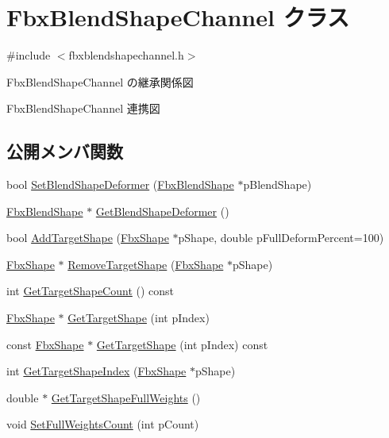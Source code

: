 \hypertarget{class_fbx_blend_shape_channel}{}\section{Fbx\+Blend\+Shape\+Channel クラス}
\label{class_fbx_blend_shape_channel}


{\ttfamily \#include $<$fbxblendshapechannel.\+h$>$}



Fbx\+Blend\+Shape\+Channel の継承関係図


Fbx\+Blend\+Shape\+Channel 連携図
\subsection*{公開メンバ関数}
\begin{DoxyCompactItemize}
\item 
bool \hyperlink{class_fbx_blend_shape_channel_afa4cd576c24385c4ee10279a1deabc4d}{Set\+Blend\+Shape\+Deformer} (\hyperlink{class_fbx_blend_shape}{Fbx\+Blend\+Shape} $\ast$p\+Blend\+Shape)
\item 
\hyperlink{class_fbx_blend_shape}{Fbx\+Blend\+Shape} $\ast$ \hyperlink{class_fbx_blend_shape_channel_aa79b43cdb62a8dc5bbafad03acbf4425}{Get\+Blend\+Shape\+Deformer} ()
\item 
bool \hyperlink{class_fbx_blend_shape_channel_aa09d012a7304dd2098ebd2a066d53dde}{Add\+Target\+Shape} (\hyperlink{class_fbx_shape}{Fbx\+Shape} $\ast$p\+Shape, double p\+Full\+Deform\+Percent=100)
\item 
\hyperlink{class_fbx_shape}{Fbx\+Shape} $\ast$ \hyperlink{class_fbx_blend_shape_channel_a13265acf6f671cf6ec1228105831ff15}{Remove\+Target\+Shape} (\hyperlink{class_fbx_shape}{Fbx\+Shape} $\ast$p\+Shape)
\item 
int \hyperlink{class_fbx_blend_shape_channel_a61e052b389537fcb7db318853c17160c}{Get\+Target\+Shape\+Count} () const
\item 
\hyperlink{class_fbx_shape}{Fbx\+Shape} $\ast$ \hyperlink{class_fbx_blend_shape_channel_a50cdc8d0c76e13c093453efca50484a6}{Get\+Target\+Shape} (int p\+Index)
\item 
const \hyperlink{class_fbx_shape}{Fbx\+Shape} $\ast$ \hyperlink{class_fbx_blend_shape_channel_ae91fea86db9ce91da637df78762b4fff}{Get\+Target\+Shape} (int p\+Index) const
\item 
int \hyperlink{class_fbx_blend_shape_channel_a75e572afbee5b3c5c635932282b86473}{Get\+Target\+Shape\+Index} (\hyperlink{class_fbx_shape}{Fbx\+Shape} $\ast$p\+Shape)
\item 
double $\ast$ \hyperlink{class_fbx_blend_shape_channel_af3d0ae44fb85c9bdc485a7c607190cfd}{Get\+Target\+Shape\+Full\+Weights} ()
\item 
void \hyperlink{class_fbx_blend_shape_channel_a2e06faf81dd8983124645590f673d119}{Set\+Full\+Weights\+Count} (int p\+Count)
\end{DoxyCompactItemize}
